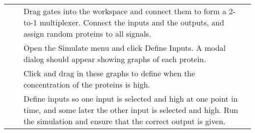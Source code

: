 \documentclass{article}
\newcounter{step}
\newcommand{\step}{\arabic{step}\stepcounter{step}}
\begin{document}
\begin{center}
\begin{longtable}{r r  p{} l }
&\step& Drag gates into the workspace and connect them to form a 2-to-1 multiplexer. Connect the inputs and the outputs, and assign random proteins to all signals.\\
&\step& Open the Simulate menu and click Define Inputs. A modal dialog should appear showing graphs of each protein.\\
&\step& Click and drag in these graphs to define when the concentration of the proteins is high.\\
&\step& Define inputs so one input is selected and high at one point in time, and some later the other input is selected and high. Run the simulation and ensure that the correct output is given. \\

\end{longtable}
\end{center}

\newpage
\end{document}
